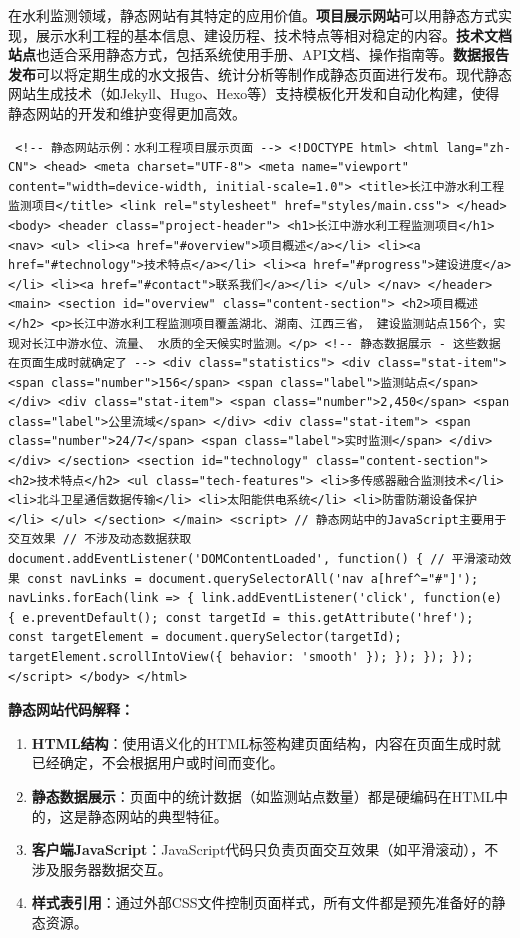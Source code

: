 {在水利监测领域，静态网站有其特定的应用价值。\textbf{项目展示网站}可以用静态方式实现，展示水利工程的基本信息、建设历程、技术特点等相对稳定的内容。\textbf{技术文档站点}也适合采用静态方式，包括系统使用手册、API文档、操作指南等。\textbf{数据报告发布}可以将定期生成的水文报告、统计分析等制作成静态页面进行发布。现代静态网站生成技术（如Jekyll、Hugo、Hexo等）支持模板化开发和自动化构建，使得静态网站的开发和维护变得更加高效。 \begin{verbatim} <!-- 静态网站示例：水利工程项目展示页面 --> <!DOCTYPE html> <html lang="zh-CN"> <head> <meta charset="UTF-8"> <meta name="viewport" content="width=device-width, initial-scale=1.0"> <title>长江中游水利工程监测项目</title> <link rel="stylesheet" href="styles/main.css"> </head> <body> <header class="project-header"> <h1>长江中游水利工程监测项目</h1> <nav> <ul> <li><a href="#overview">项目概述</a></li> <li><a href="#technology">技术特点</a></li> <li><a href="#progress">建设进度</a></li> <li><a href="#contact">联系我们</a></li> </ul> </nav> </header> <main> <section id="overview" class="content-section"> <h2>项目概述</h2> <p>长江中游水利工程监测项目覆盖湖北、湖南、江西三省， 建设监测站点156个，实现对长江中游水位、流量、 水质的全天候实时监测。</p> <!-- 静态数据展示 - 这些数据在页面生成时就确定了 --> <div class="statistics"> <div class="stat-item"> <span class="number">156</span> <span class="label">监测站点</span> </div> <div class="stat-item"> <span class="number">2,450</span> <span class="label">公里流域</span> </div> <div class="stat-item"> <span class="number">24/7</span> <span class="label">实时监测</span> </div> </div> </section> <section id="technology" class="content-section"> <h2>技术特点</h2> <ul class="tech-features"> <li>多传感器融合监测技术</li> <li>北斗卫星通信数据传输</li> <li>太阳能供电系统</li> <li>防雷防潮设备保护</li> </ul> </section> </main> <script> // 静态网站中的JavaScript主要用于交互效果 // 不涉及动态数据获取 document.addEventListener('DOMContentLoaded', function() { // 平滑滚动效果 const navLinks = document.querySelectorAll('nav a[href^="#"]'); navLinks.forEach(link => { link.addEventListener('click', function(e) { e.preventDefault(); const targetId = this.getAttribute('href'); const targetElement = document.querySelector(targetId); targetElement.scrollIntoView({ behavior: 'smooth' }); }); }); }); </script> </body> </html> \end{verbatim} \textbf{静态网站代码解释：} \begin{enumerate} \def\labelenumi{\arabic{enumi}.} \item \textbf{HTML结构}：使用语义化的HTML标签构建页面结构，内容在页面生成时就已经确定，不会根据用户或时间而变化。 \item \textbf{静态数据展示}：页面中的统计数据（如监测站点数量）都是硬编码在HTML中的，这是静态网站的典型特征。 \item \textbf{客户端JavaScript}：JavaScript代码只负责页面交互效果（如平滑滚动），不涉及服务器数据交互。 \item \textbf{样式表引用}：通过外部CSS文件控制页面样式，所有文件都是预先准备好的静态资源。 \end{enumerate} }
